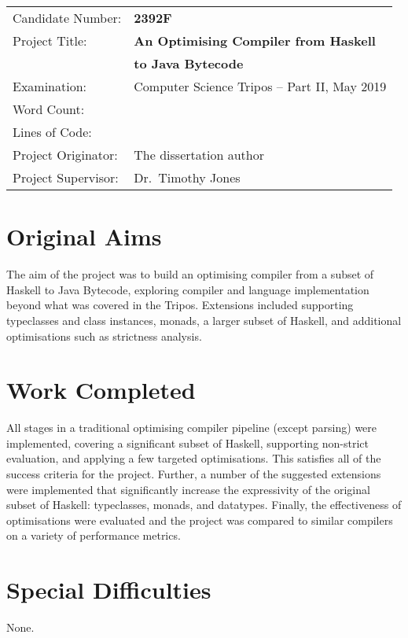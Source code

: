 \documentclass[dissertation.tex]{subfiles}
\begin{document}
{\large
\begin{tabular}{ll}
Candidate Number:   & \textbf{2392F} \\
Project Title:      & \textbf{An Optimising Compiler from Haskell} \\
                    & \textbf{to Java Bytecode} \\
Examination:        & Computer Science Tripos -- Part II, May 2019 \\
Word Count:         & \footnotemark[1] \\
Lines of Code:      & \footnotemark[2] \\
Project Originator: & The dissertation author \\
Project Supervisor: & Dr.\ Timothy Jones \\ 
\end{tabular}
}

\section*{Original Aims}
{
    The aim of the project was to build an optimising compiler from a subset of Haskell to Java Bytecode, exploring compiler and language implementation beyond what was covered in the Tripos. Extensions included supporting typeclasses and class instances, monads, a larger subset of Haskell, and additional optimisations such as strictness analysis.
}
\section*{Work Completed}
{
    All stages in a traditional optimising compiler pipeline (except parsing) were implemented, covering a significant subset of Haskell, supporting non-strict evaluation, and applying a few targeted optimisations. This satisfies all of the success criteria for the project. Further, a number of the suggested extensions were implemented that significantly increase the expressivity of the original subset of Haskell: typeclasses, monads, and datatypes. Finally, the effectiveness of optimisations were evaluated and the project was compared to similar compilers on a variety of performance metrics.
}
\section*{Special Difficulties}
{
    None.
}

\end{document}
